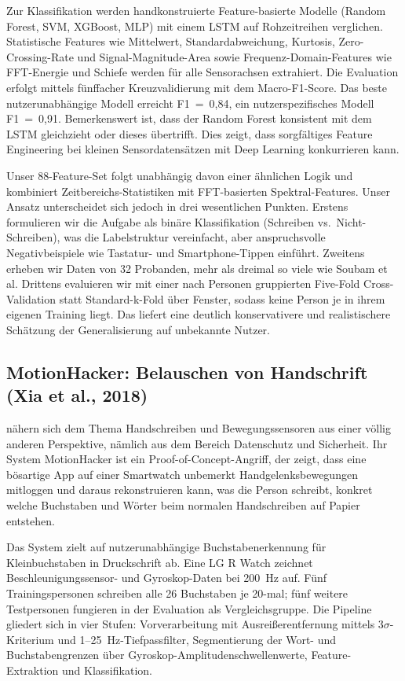 Zur Klassifikation werden handkonstruierte Feature-basierte Modelle (Random Forest, SVM, XGBoost, MLP) mit einem LSTM auf Rohzeitreihen verglichen. Statistische Features wie Mittelwert, Standardabweichung, Kurtosis, Zero-Crossing-Rate und Signal-Magnitude-Area sowie Frequenz-Domain-Features wie FFT-Energie und Schiefe werden für alle Sensorachsen extrahiert. Die Evaluation erfolgt mittels fünffacher Kreuzvalidierung mit dem Macro-F1-Score. Das beste nutzerunabhängige Modell erreicht F1~=~0,84, ein nutzerspezifisches Modell F1~=~0,91. Bemerkenswert ist, dass der Random Forest konsistent mit dem LSTM gleichzieht oder dieses übertrifft. Dies zeigt, dass sorgfältiges Feature Engineering bei kleinen Sensordatensätzen mit Deep Learning konkurrieren kann.

Unser 88-Feature-Set folgt unabhängig davon einer ähnlichen Logik und kombiniert Zeitbereichs-Statistiken mit FFT-basierten Spektral-Features. Unser Ansatz unterscheidet sich jedoch in drei wesentlichen Punkten. Erstens formulieren wir die Aufgabe als binäre Klassifikation (Schreiben vs.\ Nicht-Schreiben), was die Labelstruktur vereinfacht, aber anspruchsvolle Negativbeispiele wie Tastatur- und Smartphone-Tippen einführt. Zweitens erheben wir Daten von 32 Probanden, mehr als dreimal so viele wie Soubam et al. Drittens evaluieren wir mit einer nach Personen gruppierten Five-Fold Cross-Validation statt Standard-k-Fold über Fenster, sodass keine Person je in ihrem eigenen Training liegt. Das liefert eine deutlich konservativere und realistischere Schätzung der Generalisierung auf unbekannte Nutzer.

\subsection{MotionHacker: Belauschen von Handschrift (Xia et al., 2018)}

\citet{xiamotionhacker2018} nähern sich dem Thema Handschreiben und Bewegungssensoren aus einer völlig anderen Perspektive, nämlich aus dem Bereich Datenschutz und Sicherheit. Ihr System MotionHacker ist ein Proof-of-Concept-Angriff, der zeigt, dass eine bösartige App auf einer Smartwatch unbemerkt Handgelenksbewegungen mitloggen und daraus rekonstruieren kann, was die Person schreibt, konkret welche Buchstaben und Wörter beim normalen Handschreiben auf Papier entstehen.

Das System zielt auf nutzerunabhängige Buchstabenerkennung für Kleinbuchstaben in Druckschrift ab. Eine LG R Watch zeichnet Beschleunigungssensor- und Gyroskop-Daten bei 200~Hz auf. Fünf Trainingspersonen schreiben alle 26 Buchstaben je 20-mal; fünf weitere Testpersonen fungieren in der Evaluation als Vergleichsgruppe. Die Pipeline gliedert sich in vier Stufen: Vorverarbeitung mit Ausreißerentfernung mittels 3$\sigma$-Kriterium und 1--25~Hz-Tiefpassfilter, Segmentierung der Wort- und Buchstabengrenzen über Gyroskop-Amplitudenschwellenwerte, Feature-Extraktion und Klassifikation.

